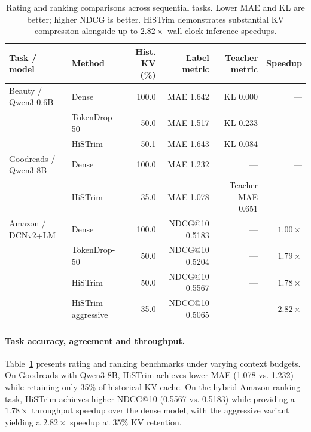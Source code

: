 \begin{table}[t]
\centering\small
\begin{tabular}{llrrrr}
\toprule
Task / model & Method & Hist. KV (\%) & Label metric & Teacher metric & Speedup \\
\midrule
Beauty / Qwen3-0.6B & Dense & 100.0 & MAE 1.642 & KL 0.000 & --- \\
 & TokenDrop-50 & 50.0 & MAE 1.517 & KL 0.233 & --- \\
 & HiSTrim & 50.1 & MAE 1.643 & KL 0.084 & --- \\
\midrule
Goodreads / Qwen3-8B & Dense & 100.0 & MAE 1.232 & --- & --- \\
 & HiSTrim & 35.0 & MAE 1.078 & Teacher MAE 0.651 & --- \\
\midrule
Amazon / DCNv2+LM & Dense & 100.0 & NDCG@10 0.5183 & --- & $1.00\times$ \\
 & TokenDrop-50 & 50.0 & NDCG@10 0.5204 & --- & $1.79\times$ \\
 & HiSTrim & 50.0 & NDCG@10 0.5567 & --- & $1.78\times$ \\
 & HiSTrim aggressive & 35.0 & NDCG@10 0.5065 & --- & $2.82\times$ \\
\bottomrule
\end{tabular}
\caption{Rating and ranking comparisons across sequential tasks. Lower MAE and KL are
better; higher NDCG is better. HiSTrim demonstrates substantial KV compression alongside
up to $2.82\times$ wall-clock inference speedups.}
\label{tab:histrim_task_fidelity}
\end{table}

\paragraph{Task accuracy, agreement and throughput.}
Table~\ref{tab:histrim_task_fidelity} presents rating and ranking benchmarks under
varying context budgets. On Goodreads with Qwen3-8B, HiSTrim achieves lower MAE
(1.078 vs. 1.232) while retaining only 35\% of historical KV cache. On the hybrid
Amazon ranking task, HiSTrim achieves higher NDCG@10 (0.5567 vs. 0.5183) while providing
a $1.78\times$ throughput speedup over the dense model, with the aggressive variant
yielding a $2.82\times$ speedup at 35\% KV retention.
